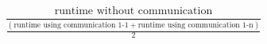 \[
\frac{\mbox{runtime without communication}}{\frac{\left(\mbox{runtime using communication 1-1} + \mbox{runtime using communication 1-n}\right)}{2}}
\] 


%
%
%
%
